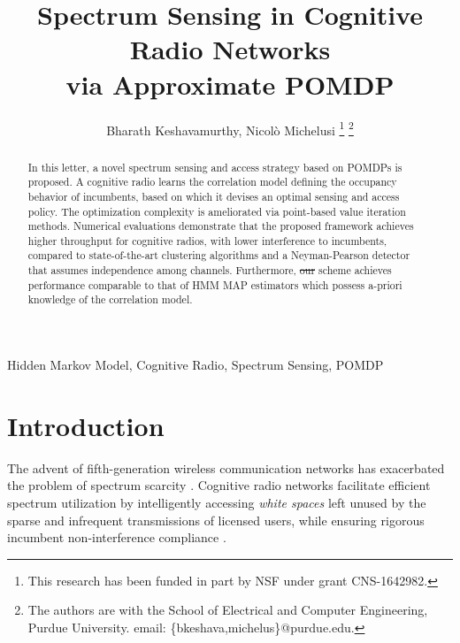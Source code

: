 \documentclass[10pt,twocolumn]{IEEEtran}
\title{Spectrum Sensing in Cognitive Radio Networks
\\
via Approximate POMDP}
\author{Bharath Keshavamurthy, Nicol\`{o} Michelusi
\thanks{This research has been funded in part by NSF under grant CNS-1642982.}
\thanks{The authors are with the School of Electrical and Computer Engineering, Purdue University. email: \{bkeshava,michelus\}@purdue.edu.}
\vspace{-12mm}}
\newcommand{\sst}[1]{\st{#1}}
\newcommand{\add}[1]{{\color{red}{#1}}}
\begin{document}
\maketitle
\thispagestyle{empty}
\pagestyle{empty} 
\begin{abstract}
In this letter, a novel spectrum sensing and access strategy based on POMDPs is proposed. A cognitive radio learns the correlation model defining the occupancy behavior of incumbents, based on which it devises an optimal sensing and access policy. The optimization complexity is ameliorated via point-based value iteration methods. Numerical evaluations demonstrate that the proposed framework achieves higher throughput for cognitive radios, with lower interference to incumbents, compared to state-of-the-art clustering algorithms and a Neyman-Pearson detector that assumes independence among channels. Furthermore, \sst{our}\add{the proposed} scheme achieves performance comparable to that of HMM MAP estimators which possess a-priori knowledge of the correlation model.
\end{abstract}
\begin{IEEEkeywords}
Hidden Markov Model, Cognitive Radio, Spectrum Sensing, POMDP
\end{IEEEkeywords}
\vspace{-4mm}
\section{Introduction}\label{I}
The advent of fifth-generation wireless communication networks has exacerbated the problem of spectrum scarcity \cite{7158089}. Cognitive radio networks facilitate efficient spectrum utilization by intelligently accessing \emph{white spaces} left unused by the sparse and infrequent transmissions of licensed users, while ensuring rigorous incumbent non-interference compliance \cite{4562537}. 
\end{document}
